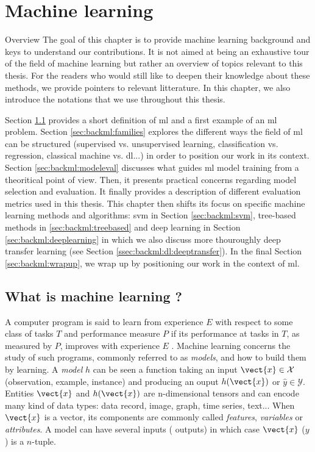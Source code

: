 \chapter{Machine learning}
\label{chap:backml}

\begin{overview}{Overview}
The goal of this chapter is to provide machine learning background and keys to understand our contributions. It is not aimed at being an exhaustive tour of the field of machine learning but rather an overview of topics relevant to this thesis. For the readers who would still like to deepen their knowledge about these methods, we provide pointers to relevant litterature. In this chapter, we also introduce the notations that we use throughout this thesis.

Section \ref{sec:backml:whatisml} provides a short definition of \acrlong{ml} and a first example of an \acrshort{ml} problem. Section \ref{sec:backml:families} explores the different ways the field of \acrlong{ml} can be structured (\eg supervised vs. unsupervised learning, classification vs. regression, classical machine vs. \acrlong{dl}...) in order to position our work in its context. Section \ref{sec:backml:modeleval} discusses what guides \acrlong{ml} model training from a theoritical point of view. Then, it presents practical concerns regarding model selection and evaluation. It finally provides a description of different evaluation metrics used in this thesis. This chapter then shifts its focus on specific machine learning methods and algorithms: \acrlong{svm} in Section \ref{sec:backml:svm}, tree-based methods in \ref{sec:backml:treebased} and deep learning in Section \ref{sec:backml:deeplearning} in which we also discuss more thouroughly deep transfer learning (see Section \ref{ssec:backml:dl:deeptransfer}). In the final Section \ref{sec:backml:wrapup}, we wrap up by positioning our work in the context of \acrlong{ml}.
\end{overview}

\section{What is machine learning ?}
\label{sec:backml:whatisml}

A computer program is said to learn from experience $E$ with respect to some class
of tasks $T$ and performance measure $P$ if its performance at tasks in $T$, as
measured by $P$, improves with experience $E$ \parencite{mitchell1997machine}.
Machine learning concerns the study of such programs, commonly referred to as
\textit{models}, and how to build them by learning. A \textit{model} $h$ can be
seen a function taking an input $\vect{x} \in \mathcal{X}$ (\aka observation,
example, instance) and producing an ouput $h(\vect{x})$ or $\hat{y} \in \mathcal{Y}$.
Entities $\vect{x}$ and $h(\vect{x})$ are n-dimensional tensors and can encode
many kind of data types: data record, image, graph, time series, text... When
$\vect{x}$ is a vector, its components are commonly called \textit{features},
\textit{variables} or \textit{attributes}. A model can have several inputs (\resp
outputs) in which case $\vect{x}$ (\resp $y$) is a $n$-tuple.

